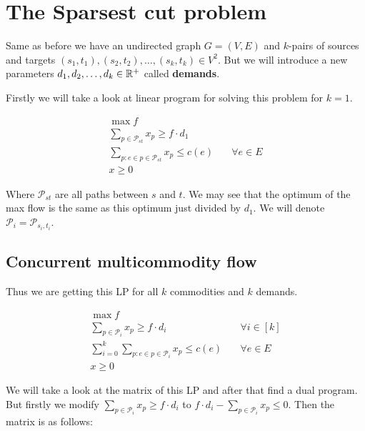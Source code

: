 \chapter{The Sparsest cut problem}

Same as before we have an undirected graph $G = (V,E)$ and $k$-pairs of sources and targets $(s_{1},t_{1}), (s_{2}, t_{2}), \dots, (s_{k}, t_{k}) \in V^{2}$. But we will introduce a new parameters $d_{1}, d_{2}, \dots, d_{k} \in \mathbb{R}^{+}$ called \textbf{demands}.

Firstly we will take a look at linear program for solving this problem for $k = 1$.

$$
\begin{aligned}
	\max f \\
	\sum_{p \in \mathcal{P}_{st}} x_{p} \geq f \cdot d_{1} \\
	\sum_{p : e \in p \in \mathcal{P}_{st}} x_{p} \leq c(e) & \quad \forall e \in E\\
	x \geq 0
\end{aligned}
$$

Where $\mathcal{P}_{st}$ are all paths between $s$ and $t$. We may see that the optimum of the max flow is the same as this optimum just divided by $d_{1}$. We will denote $\mathcal{P}_{i} = \mathcal{P}_{s_{i}, t_{i}}$.

\section{Concurrent multicommodity flow}

Thus we are getting this LP for all $k$ commodities and $k$ demands.

$$
\begin{aligned}
	\max f \\
	\sum_{p \in \mathcal{P}_{i}} x_{p} \geq f \cdot d_{i} & \quad \forall i \in [k]\\
	\sum_{i = 0}^{k} \sum_{p: e \in p \in \mathcal{P}_{i}} x_{p} \leq c(e) & \quad \forall e \in E\\
	x \geq 0
\end{aligned}
$$

We will take a look at the matrix of this LP and after that find a dual program. But firstly we modify $\sum_{p \in \mathcal{P}_{i}} x_{p} \geq f \cdot d_{i}$ to $f \cdot d_{i} - \sum_{p \in \mathcal{P}_{i}} x_{p} \leq 0$. Then the matrix is as follows:

